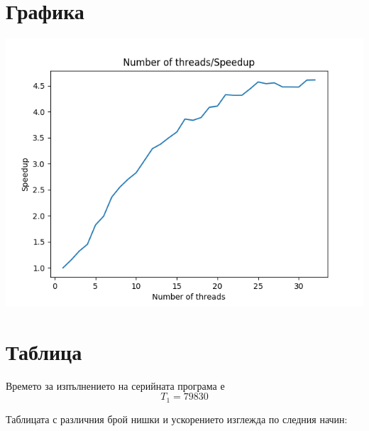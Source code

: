 \section{Графика}

\includegraphics{speedup}

\section{Таблица}
Времето за изпълнението на серийната програма е $$T_1 = 79830$$

Таблицата с различния брой нишки и ускорението изглежда по следния начин:

